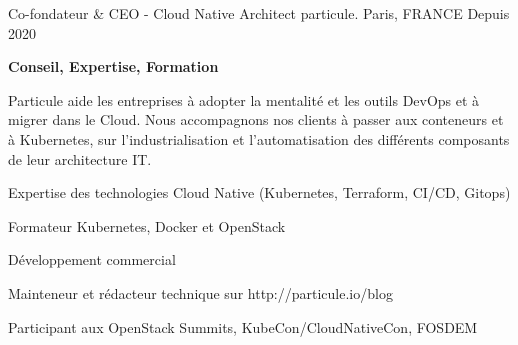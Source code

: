 

\begin{cventries}

\cventry
    {Co-fondateur \& CEO - Cloud Native Architect} %
    {particule.} %
    {Paris, FRANCE} %
    {Depuis 2020} %
    {
      \begin{cvitems} %
      \item {\textbf{Conseil, Expertise, Formation}}
      \item {Particule aide les entreprises à adopter la mentalité et les outils DevOps
        et à migrer dans le Cloud. Nous accompagnons nos clients à passer aux
          conteneurs et à Kubernetes, sur l'industrialisation et
          l'automatisation des différents composants de leur architecture IT.}
        \item {Expertise des technologies Cloud Native (Kubernetes, Terraform,
          CI/CD, Gitops)}
        \item {Formateur Kubernetes, Docker et OpenStack}
        \item {Développement commercial}
        \item {Mainteneur et rédacteur technique sur http://particule.io/blog}
        \item {Participant aux OpenStack Summits, KubeCon/CloudNativeCon, FOSDEM}
      \end{cvitems}
    }


\end{cventries}
